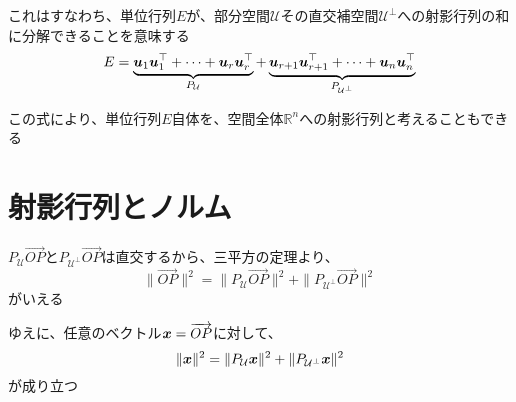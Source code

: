 \documentclass[../../../topic_linear-algebra]{subfiles}
\begin{document}
\br

これはすなわち、単位行列$E$が、部分空間$\mathcal{U}$その直交補空間$\mathcal{U}^{\perp}$への射影行列の和に分解できることを意味する
\begin{equation*}
  E = \underbrace{\vb*{u}_1 \vb*{u}_1^\top + \cdots + \vb*{u}_r \vb*{u}_r^\top}_{P_{\mathcal{U}}} + \underbrace{\vb*{u}_{r+1} \vb*{u}_{r+1}^\top + \cdots + \vb*{u}_n \vb*{u}_n^\top}_{P_{\mathcal{U}^{\perp}}}
\end{equation*}

この式により、単位行列$E$自体を、空間全体$\mathbb{R}^n$への射影行列と考えることもできる

\sectionline
\section{射影行列とノルム}

$P_{\mathcal{U}}\overrightarrow{OP}$と$P_{\mathcal{U}^{\perp}}\overrightarrow{OP}$は直交するから、三平方の定理より、
\begin{equation*}
  \| \overrightarrow{OP} \|^2 = \| P_{\mathcal{U}}\overrightarrow{OP} \|^2 + \| P_{\mathcal{U}^{\perp}}\overrightarrow{OP} \|^2
\end{equation*}
がいえる

\br

ゆえに、任意のベクトル$\vb*{x} = \overrightarrow{OP}$に対して、
\begin{equation*}
  \| \vb*{x} \|^2 = \| P_{\mathcal{U}}\vb*{x} \|^2 + \| P_{\mathcal{U}^{\perp}}\vb*{x} \|^2
\end{equation*}
が成り立つ
\end{document}
